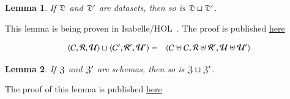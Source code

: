 \documentclass{elsarticle}
\newtheorem{lemma}{Lemma}
\begin{document}
\begin{lemma}
   If $\mathfrak{D}$ and $\mathfrak{D}'$ are datasets, then so is $\mathfrak{D}\sqcup\mathfrak{D}'$.
\end{lemma}
   This lemma is being proven in Isabelle/HOL~\cite{Isabelle}. The proof is published \href{location.domain}{here}

\begin{definition}
\begin{eqnarray}
   \langle{\mathcal{C}},{\mathcal{R}},{\mathcal{U}}\rangle\sqcup\langle{\mathcal{C}'},{\mathcal{R}'},{\mathcal{U}'}\rangle&=&\langle{\mathcal{C}\uplus\mathcal{C}},{\mathcal{R}\uplus\mathcal{R}'},{\mathcal{U}\uplus\mathcal{U}'}\rangle
\end{eqnarray}
\end{definition}
\begin{lemma}
   If $\mathfrak{Z}$ and $\mathfrak{Z}'$ are schemas, then so is $\mathfrak{Z}\sqcup\mathfrak{Z}'$.
\end{lemma}
The proof of this lemma is published \href{location.domain}{here}
\end{document}

